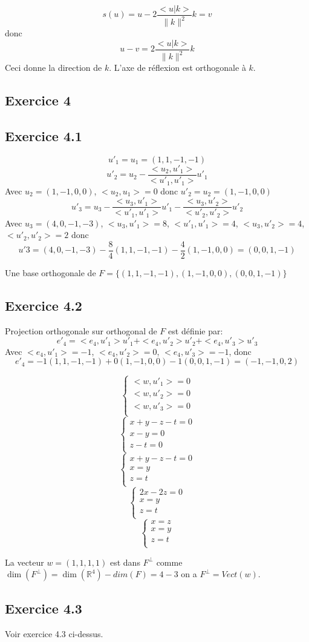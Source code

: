 \documentclass[]{book}
\theoremstyle{definition}
\newcommand{\bb}[1]{\mathbb{#1}}
\newcommand{\R}{\bb{R}}
\begin{document}
$$
s(u) = u - 2\frac{<u|k>}{\lVert k \rVert^2} k = v
$$
donc
$$
u - v = 2\frac{<u|k>}{\lVert k \rVert^2} k
$$
Ceci donne la direction de $k$. L'axe de r\'eflexion est orthogonale \`a $k$.   

\subsection*{Exercice 4}
\subsection*{Exercice 4.1}
$$u'_1 = u_1 = (1,1,-1,-1)$$
$$u'_2 = u_2 - \frac{<u_2,u'_1>}{<u'_1,u'_1>}u'_1$$
Avec $u_2=(1,-1,0,0)$, $<u_2, u_1> = 0$ donc $u'_2 = u_2 = (1,-1,0,0)$
$$u'_3 = u_3 - \frac{<u_3,u'_1>}{<u'_1,u'_1>}u'_1 - \frac{<u_3,u'_2>}{<u'_2,u'_2>}u'_2$$
Avec $u_3=(4,0,-1,-3)$, $<u_3, u'_1> = 8$, $<u'_1, u'_1> = 4$, $<u_3, u'_2> = 4$, $<u'_2, u'_2> = 2$ donc 
$$u'3 = (4,0,-1,-3) - \frac{8}{4}(1,1,-1,-1) - \frac{4}{2} (1,-1,0,0) = (0, 0, 1, -1)$$

Une base orthogonale de $F = \{(1,1,-1,-1),  (1,-1,0,0), (0, 0, 1, -1)\}$
\subsection*{Exercice 4.2}
Projection orthogonale sur orthogonal de $F$ est d\'efinie par:
$$e'_4 = <e_4,u'_1>u'_1 + <e_4,u'_2>u'_2 + <e_4,u'_3>u'_3$$
Avec $<e_4,u'_1> = -1$, $<e_4,u'_2> = 0$, $<e_4,u'_3> = -1$, donc
$$
e'_4 = -1(1,1,-1,-1) + 0 (1,-1,0,0) -1 (0,0,1,-1) = (-1, -1, 0, 2)
$$

$$
\left\{
    \begin{array}{l}
        <w, u'_1> = 0 \\
        <w, u'_2> = 0 \\
        <w, u'_3> = 0 \\
    \end{array}
\right.
$$
$$
\left\{
    \begin{array}{l}
        x + y - z - t = 0 \\
        x - y = 0 \\
        z - t = 0 \\
    \end{array}
\right.
$$
$$
\left\{
    \begin{array}{l}
        x + y - z - t = 0 \\
        x  = y \\
        z  = t \\
    \end{array}
\right.
$$
$$
\left\{
    \begin{array}{l}
        2x - 2z  = 0 \\
        x  = y \\
        z  = t \\
    \end{array}
\right.
$$
$$
\left\{
    \begin{array}{l}
        x  = z \\
        x  = y \\
        z  = t \\
    \end{array}
\right.
$$

La vecteur $w = (1, 1, 1, 1)$ est dans $F^{\perp}$ comme $\dim(F^{\perp}) = \dim(\R^4)-dim(F) =  4 - 3$ on a $F^{\perp} = Vect(w)$.


\subsection*{Exercice 4.3}
Voir exercice 4.3 ci-dessus.
\end{document}
